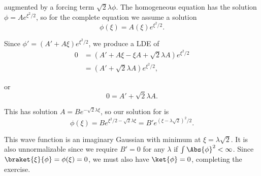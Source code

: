 {augmented by a forcing term \(\sqrt{2}\lambda \phi\).  The homogeneous equation has the solution \(\phi = A e^{\xi^2/2}\), so for the complete equation we assume a solution
%
\begin{equation}\label{eqn:qmIexamPractice2008Dec:1e:50}
\phi(\xi) = A(\xi) e^{\xi^2/2}.
\end{equation}

Since \(\phi' = (A' + A \xi) e^{\xi^2/2}\), we produce a LDE of
%
\begin{equation}\label{eqn:qmIexamPractice:670}
\begin{aligned}
0 &= (A' + A \xi -\xi A + \sqrt{2} \lambda A ) e^{\xi^2/2} \\
&= (A' + \sqrt{2} \lambda A ) e^{\xi^2/2},
\end{aligned}
\end{equation}

or
\begin{equation}\label{eqn:qmIexamPractice2008Dec:1e:60}
0 = A' + \sqrt{2} \lambda A.
\end{equation}

This has solution \(A = B e^{-\sqrt{2} \lambda \xi}\), so our solution for  is
\begin{equation}\label{eqn:qmIexamPractice2008Dec:1e:70}
\phi(\xi) = B e^{\xi^2/2 - \sqrt{2} \lambda \xi}
= B' e^{ (\xi - \lambda \sqrt{2} )^2/2}.
\end{equation}

This wave function is an imaginary Gaussian with minimum at \(\xi = \lambda\sqrt{2}\).  It is also unnormalizable since we require \(B' = 0\) for any \(\lambda\) if \(\int \Abs{\phi}^2 < \infty\).  Since \(\braket{\xi}{\phi} = \phi(\xi) = 0\), we must also have \(\ket{\phi} = 0\), completing the exercise.

} %
